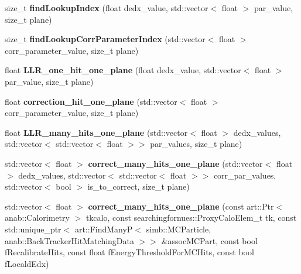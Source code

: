 \begin{DoxyCompactItemize}
\item 
size\+\_\+t {\bfseries find\+Lookup\+Index} (float dedx\+\_\+value, std\+::vector$<$ float $>$ par\+\_\+value, size\+\_\+t plane)\hypertarget{classsearchingfornues_1_1LLRPID_a891182e0af5e60e975e86ea5d2973e11}{}\label{classsearchingfornues_1_1LLRPID_a891182e0af5e60e975e86ea5d2973e11}

\item 
size\+\_\+t {\bfseries find\+Lookup\+Corr\+Parameter\+Index} (std\+::vector$<$ float $>$ corr\+\_\+parameter\+\_\+value, size\+\_\+t plane)\hypertarget{classsearchingfornues_1_1LLRPID_a855edcd3348bff52449abd4b90b42838}{}\label{classsearchingfornues_1_1LLRPID_a855edcd3348bff52449abd4b90b42838}

\item 
float {\bfseries L\+L\+R\+\_\+one\+\_\+hit\+\_\+one\+\_\+plane} (float dedx\+\_\+value, std\+::vector$<$ float $>$ par\+\_\+value, size\+\_\+t plane)\hypertarget{classsearchingfornues_1_1LLRPID_a615612fe3657b51e18bf1e514399363a}{}\label{classsearchingfornues_1_1LLRPID_a615612fe3657b51e18bf1e514399363a}

\item 
float {\bfseries correction\+\_\+hit\+\_\+one\+\_\+plane} (std\+::vector$<$ float $>$ corr\+\_\+parameter\+\_\+value, size\+\_\+t plane)\hypertarget{classsearchingfornues_1_1LLRPID_a06901bea0c1a2e5b9e3d4ce8b5a96e82}{}\label{classsearchingfornues_1_1LLRPID_a06901bea0c1a2e5b9e3d4ce8b5a96e82}

\item 
float {\bfseries L\+L\+R\+\_\+many\+\_\+hits\+\_\+one\+\_\+plane} (std\+::vector$<$ float $>$ dedx\+\_\+values, std\+::vector$<$ std\+::vector$<$ float $>$$>$ par\+\_\+values, size\+\_\+t plane)\hypertarget{classsearchingfornues_1_1LLRPID_ac8090da570daccff827fa96685b54f1e}{}\label{classsearchingfornues_1_1LLRPID_ac8090da570daccff827fa96685b54f1e}

\item 
std\+::vector$<$ float $>$ {\bfseries correct\+\_\+many\+\_\+hits\+\_\+one\+\_\+plane} (std\+::vector$<$ float $>$ dedx\+\_\+values, std\+::vector$<$ std\+::vector$<$ float $>$$>$ corr\+\_\+par\+\_\+values, std\+::vector$<$ bool $>$ is\+\_\+to\+\_\+correct, size\+\_\+t plane)\hypertarget{classsearchingfornues_1_1LLRPID_a2ac2b47463117811580f4e52f99bd1b2}{}\label{classsearchingfornues_1_1LLRPID_a2ac2b47463117811580f4e52f99bd1b2}

\item 
std\+::vector$<$ float $>$ {\bfseries correct\+\_\+many\+\_\+hits\+\_\+one\+\_\+plane} (const art\+::\+Ptr$<$ anab\+::\+Calorimetry $>$ tkcalo, const searchingfornues\+::\+Proxy\+Calo\+Elem\+\_\+t tk, const std\+::unique\+\_\+ptr$<$ art\+::\+Find\+ManyP$<$ simb\+::\+M\+C\+Particle, anab\+::\+Back\+Tracker\+Hit\+Matching\+Data $>$$>$ \&assoc\+M\+C\+Part, const bool f\+Recalibrate\+Hits, const float f\+Energy\+Threshold\+For\+M\+C\+Hits, const bool f\+Locald\+Edx)\hypertarget{classsearchingfornues_1_1LLRPID_a8ba5e908853f2bd4c123fcd448893810}{}\label{classsearchingfornues_1_1LLRPID_a8ba5e908853f2bd4c123fcd448893810}

\end{DoxyCompactItemize}
